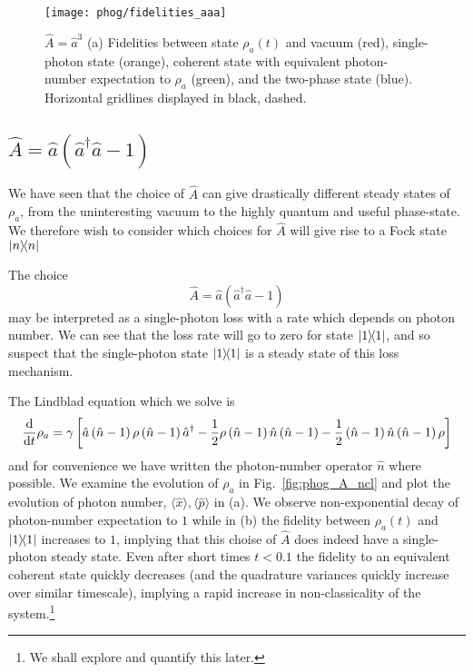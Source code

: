 \begin{figure}[htp]
\centering
\texttt{[image: phog/fidelities\_aaa]}
\caption{\label{fig:phog_lindblad_three_photon_loss}$\hat{A} = \hat{a}^3$ (a) Fidelities between state $\rho_a\left(t\right)$ and vacuum (red), single-photon state (orange), coherent state with equivalent photon-number expectation to $\rho_a$ (green), and the two-phase state (blue).  Horizontal gridlines displayed in black, dashed.}
\end{figure}

\clearpage
\subsection{$\hat{A} = \hat{a}\left(\hat{a}^\dagger \hat{a} - 1\right)$}\label{sec:phog_single_mode_ncl_1}
We have seen that the choice of $\hat{A}$ can give drastically different steady states of $\rho_a$,  from the uninteresting vacuum to the highly quantum and useful phase-state. We therefore wish to consider which choices for $\hat{A}$ will give rise to a Fock state $\dyad{n}$

The choice 
\begin{equation}\label{eqn:phog_A_ncl}
\hat{A} = \hat{a}\left(\hat{a}^\dagger \hat{a} - 1\right)
\end{equation}
may be interpreted as a single-photon loss with a rate which depends on photon number. We can see that the loss rate will go to zero for state $\dyad{1}$, and so suspect that the single-photon state $\dyad{1}$ is a steady state of this loss mechanism.

The Lindblad equation which we solve is
\begin{equation}\label{eqn:phog_ncl_lindblad}
\frac{\mathrm{d}}{\mathrm{d}t} \rho_a = \gamma \left[ \hat{a}\left(\hat{n}-1\right) \rho \left(\hat{n}-1\right)\hat{a}^\dagger - \frac{1}{2} \rho \left(\hat{n}-1\right) \hat{n} \left(\hat{n}-1\right) - \frac{1}{2} \left(\hat{n}-1\right)\hat{n}\left(\hat{n}-1\right) \rho \right]
\end{equation}
and for convenience we have written the photon-number operator $\hat{n}$ where possible.
We examine the evolution of $\rho_a$ in Fig.~\ref{fig:phog_A_ncl} and plot the evolution of photon number, $\langle \hat{x}\rangle, \langle \hat{p}\rangle$ in (a). We observe non-exponential decay of photon-number expectation to $1$ %
while in (b) the fidelity between $\rho_a\left(t\right)$ and $\dyad{1}$ increases to $1$, implying that this choise of $\hat{A}$ does indeed have a single-photon steady state. Even after short times $t < 0.1$ the fidelity to an equivalent coherent state quickly decreases (and the quadrature variances quickly increase over similar timescale), implying a rapid increase in non-classicality of the system.\footnote{We shall explore and quantify this later.}

